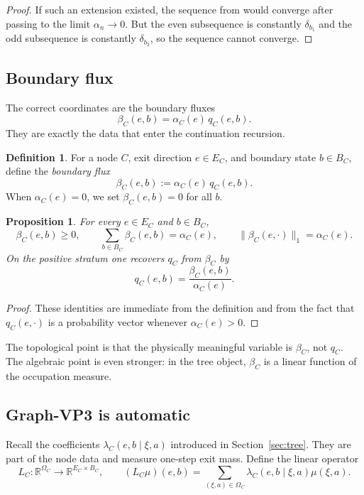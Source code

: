 \documentclass[12pt]{article}
\newtheorem{proposition}[theorem]{Proposition}
\theoremstyle{definition}
\newtheorem{definition}[theorem]{Definition}
\newcommand{\R}{\mathbb{R}}
\newcommand{\1}{\mathbf{1}}
\begin{document}
\begin{proof}
If such an extension existed, the sequence from  would converge after
passing to the limit \(\alpha_n\to 0\).  But the even subsequence is constantly
\(\delta_{b_1}\) and the odd subsequence is constantly \(\delta_{b_2}\), so the sequence
cannot converge.
\end{proof}

\subsection{Boundary flux}

The correct coordinates are the boundary fluxes
\[
\beta_C(e,b)=\alpha_C(e)\,q_C(e,b).
\]
They are exactly the data that enter the continuation recursion.

\begin{definition}
\label{def:beta}
For a node \(C\), exit direction \(e\in E_C\), and boundary state \(b\in B_C\), define
the \emph{boundary flux}
\[
\beta_C(e,b):=\alpha_C(e)\,q_C(e,b).
\]
When \(\alpha_C(e)=0\), we set \(\beta_C(e,b)=0\) for all \(b\).
\end{definition}

\begin{proposition}
\label{prop:beta-basic}
For every \(e\in E_C\) and \(b\in B_C\),
\[
\beta_C(e,b)\ge 0,\qquad
\sum_{b\in B_C}\beta_C(e,b)=\alpha_C(e),
\qquad
\|\beta_C(e,\cdot)\|_1=\alpha_C(e).
\]
On the positive stratum one recovers \(q_C\) from \(\beta_C\) by
\[
q_C(e,b)=\frac{\beta_C(e,b)}{\alpha_C(e)}.
\]
\end{proposition}

\begin{proof}
These identities are immediate from the definition and from the fact that
\(q_C(e,\cdot)\) is a probability vector whenever \(\alpha_C(e)>0\).
\end{proof}

The topological point is that the physically meaningful variable is \(\beta_C\), not
\(q_C\).  The algebraic point is even stronger: in the tree object, \(\beta_C\) is a
linear function of the occupation measure.

\subsection{Graph-VP3 is automatic}

Recall the coefficients \(\lambda_C(e,b\mid \xi,a)\) introduced in
Section~\ref{sec:tree}.  They are part of the node data and measure one-step exit mass.
Define the linear operator
\begin{equation}
\label{eq:LC}
L_C:\R^{\Omega_C}\to \R^{E_C\times B_C},
\qquad
(L_C\mu)(e,b)
=
\sum_{(\xi,a)\in\Omega_C}\lambda_C(e,b\mid \xi,a)\mu(\xi,a).
\end{equation}
\end{document}
